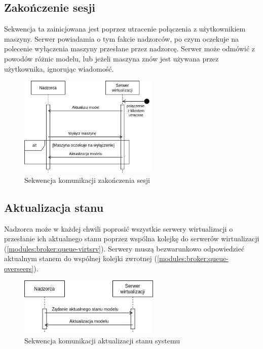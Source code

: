 \documentclass[../opis-rozwiazania.tex]{subfiles}
\begin{document}
\subsection{Zakończenie sesji}

Sekwencja ta zainicjowana jest poprzez utracenie połączenia z użytkownikiem maszyny.
Serwer powiadamia o tym fakcie nadzorców, po czym oczekuje na polecenie wyłączenia maszyny przesłane przez nadzorcę. Serwer może odmówić z powodów różnic modelu, lub jeżeli maszyna znów jest używana przez użytkownika, ignorując wiadomość.

\begin{figure}[H]
  \centering
  \includegraphics[width=0.6\textwidth]{../diagrams/sequence_diagrams/konczenie_sesji.png}
  \caption{Sekwencja komunikacji zakończenia sesji}
  \label{figure:diagrams:sequence_diagrams:konczenie_sesji}
\end{figure}

\subsection{Aktualizacja stanu}

Nadzorca może w każdej chwili poprosić wszystkie serwery wirtualizacji
o przesłanie ich aktualnego stanu poprzez wspólna kolejkę do serwerów wirtualizacji (\ref{modules:broker:queue-virtsrv}).
Serwery muszą bezwarunkowo odpowiedzieć aktualnym stanem do wspólnej kolejki zwrotnej (\ref{modules:broker:queue-overseers}).

\begin{figure}[H]
  \centering
  \includegraphics[width=0.6\textwidth]{../diagrams/sequence_diagrams/aktualizacja_stanu.png}
  \caption{Sekwencja komunikacji aktualizacji stanu systemu}
  \label{figure:diagrams:sequence_diagrams:aktualizacja_stanu}
\end{figure}
\end{document}
